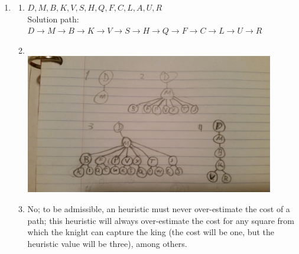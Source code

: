 \documentclass{article}
\begin{document}
\begin{enumerate}
    \item
    \begin{enumerate}
        \item $D, M, B, K, V, S, H, Q, F, C, L, A, U, R$\\
            Solution path: $D{\rightarrow}M{\rightarrow}B{\rightarrow}K{\rightarrow}V{\rightarrow}S{\rightarrow}H{\rightarrow}Q{\rightarrow}F{\rightarrow}C{\rightarrow}L{\rightarrow}U{\rightarrow}R$

        \item \textcolor{white}{.}\\ 
            \includegraphics[width=0.9\textwidth]{1b}

        \item No; to be admissible, an heuristic must never over-estimate the cost of a path; this heuristic will always over-estimate the cost for any square from which the knight can capture the king (the cost will be one, but the heuristic value will be three), among others.

\pagebreak


\end{enumerate}
\end{enumerate}
\end{document}
